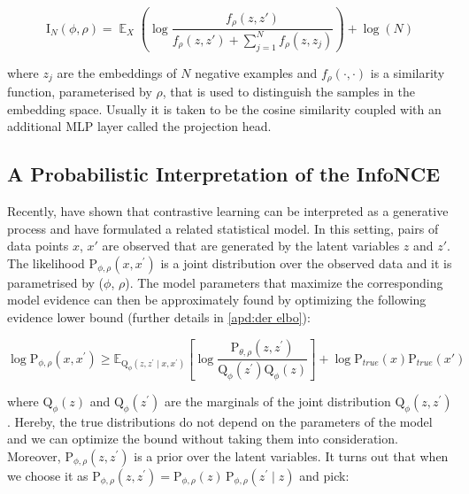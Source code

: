 \documentclass[tablecaption=bottom,wcp]{jmlr} %
\DeclareMathOperator{\EX}{\mathbb{E}}%
\begin{document}
\begin{equation} \label{eqn:infonce}
 \mathrm{I}_{N}(\phi,	\rho ) = \EX_{X}\left(\log\frac{f_{\rho }(z,z')}{f_{\rho}(z,z')+ \sum_{j=1}^{N}f_{\rho}(z,z_{j})}\right) +\log(N)
\end{equation}

where $z_{j}$ are the embeddings of $N$ negative examples and $f_{\rho}(\cdot,\cdot)$ is a similarity function, parameterised by $\rho$, that is used to distinguish the samples in the embedding space. Usually it is taken to be the cosine similarity coupled with an additional MLP layer called the projection head. 

\subsection{A Probabilistic Interpretation of the InfoNCE}

Recently, \citet{aitchison2023infonce} have shown that contrastive learning can be interpreted as a generative process and have formulated a related statistical model. In this setting, pairs of data points $x$, $x'$ are observed that are generated by the latent variables $z$ and $z'$. The likelihood $\mathrm{P}_{\phi,\rho}\left(x, x^{\prime}\right)$ is a joint distribution over the observed data and it is parametrised by ($\phi$, $\rho$).  The model parameters that maximize the corresponding model evidence can then be approximately found by optimizing the following evidence lower bound (further details in \cref{apd:der elbo}): 

\begin{equation}
\log \mathrm{P}_{\phi,\rho}\left(x, x^{\prime}\right)\geq \mathbb{E}_{\mathrm{Q}_{\phi}\left(z, z^{\prime}\mid x,x^{\prime}\right)}\left[\log\frac{\mathrm{P}_{\theta,\rho}\left(z,z^{\prime}\right)}{\mathrm{Q}_\phi\left(z^{\prime}\right)\mathrm{Q}_{\phi}\left(z\right)}\right] + \log \mathrm{P}_{true}(x)\mathrm{P}_{true}(x')
\end{equation}

where $\mathrm{Q}_\phi\left(z\right)$ and $\mathrm{Q}_\phi\left(z^{\prime}\right)$ are the marginals of the joint distribution $\mathrm{Q}_{\phi}\left(z, z^{\prime}\right)$. Hereby, the true distributions do not depend on the parameters of the model and we can optimize the bound without taking them into consideration. Moreover, $\mathrm{P}_{\phi,\rho}\left(z,z^{\prime}\right)$ is a prior over the latent variables. It turns out that when we choose it as $\mathrm{P}_{\phi,\rho}\left(z,z^{\prime}\right) = \mathrm{P}_{\phi,\rho}\left(z\right) \, \mathrm{P}_{\phi,\rho}\left(z^{\prime} \mid z \right)$ and pick:
\end{document}
